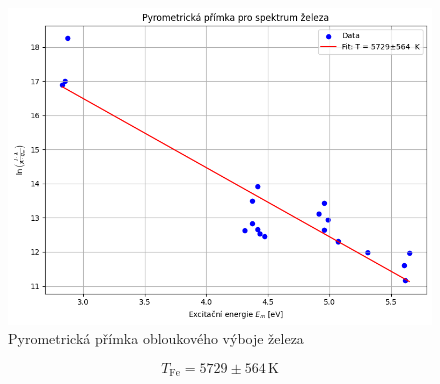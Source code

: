 \documentclass[czech,11pt,a4paper]{article}
\begin{document}
\begin{multicols}{2}
		\begin{figure}[H]
			\centering
			\includegraphics[width=0.9\linewidth]{pyrometrika}
			\caption{Pyrometrická přímka obloukového výboje železa}			
		\end{figure}
		\begin{equation*}
			T_{\mathrm{Fe}} = 5729 \pm 564 \,\mathrm{K}
		\end{equation*}

\end{multicols}
\end{document}
